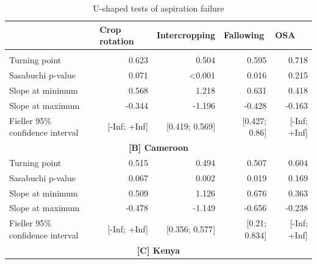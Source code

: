 \documentclass[
]{article}
\begin{document}
\begin{landscape}
\begin{longtable}[c]{@{}lrrrr@{}}
\caption{U-shaped tests of aspiration failure }
\label{tab:my-table}\\
\toprule
\textbf{} &
  \multicolumn{1}{l}{\textbf{Crop rotation}} &
  \multicolumn{1}{l}{\textbf{Intercropping}} &
  \multicolumn{1}{l}{\textbf{Fallowing}} &
  \multicolumn{1}{l}{\textbf{OSA}} \\* \midrule
\endfirsthead
%
\endhead
%
\bottomrule
\endfoot
%
\endlastfoot
%
\multicolumn{5}{c}{\textbf{{[}A{]} Pooled}}                                                                       \\* \midrule
Turning point                      & 0.623            & 0.504              & 0.595             & 0.718            \\
Sasabuchi p-value                  & 0.071            & \textless{}0.001   & 0.016             & 0.215            \\
Slope at minimum                   & 0.568            & 1.218              & 0.631             & 0.418            \\
Slope at maximum                   & -0.344           & -1.196             & -0.428            & -0.163           \\
Fieller 95\% confidence   interval & {[}-Inf; +Inf{]} & {[}0.419; 0.569{]} & {[}0.427; 0.86{]} & {[}-Inf; +Inf{]} \\* \midrule
\multicolumn{5}{c}{\textbf{{[}B{]} Cameroon}}                                                                     \\* \midrule
Turning point                      & 0.515            & 0.494              & 0.507             & 0.604            \\
Sasabuchi p-value                  & 0.067            & 0.002              & 0.019             & 0.169            \\
Slope at minimum                   & 0.509            & 1.126              & 0.676             & 0.363            \\
Slope at maximum                   & -0.478           & -1.149             & -0.656            & -0.238           \\
Fieller 95\% confidence   interval & {[}-Inf; +Inf{]} & {[}0.356; 0.577{]} & {[}0.21; 0.834{]} & {[}-Inf; +Inf{]} \\* \midrule
\multicolumn{5}{c}{\textbf{{[}C{]} Kenya}}                                                                        \\* \midrule

\end{longtable}
\end{landscape}
\end{document}
